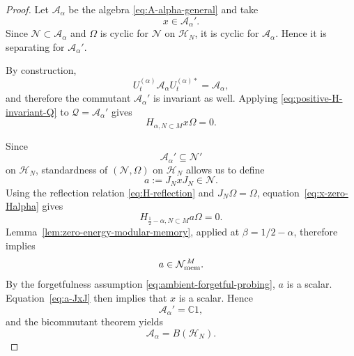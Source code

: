 \documentclass[a4paper,11pt]{article}
\theoremstyle{definition}
\begin{document}
\begin{proof}
Let $\mathcal A_\alpha$ be the algebra
\eqref{eq:A-alpha-general} and take
\begin{equation}
    x\in\mathcal A_\alpha'.
\end{equation}
Since $\mathcal N\subset\mathcal A_\alpha$ and $\Omega$ is cyclic for
$\mathcal N$ on $\mathcal H_N$, it is cyclic for $\mathcal A_\alpha$.
Hence it is separating for $\mathcal A_\alpha'$.

By construction,
\begin{equation}
    U_t^{(\alpha)}
    \mathcal A_\alpha
    U_t^{(\alpha)*}
    =
    \mathcal A_\alpha,
\end{equation}
and therefore the commutant $\mathcal A_\alpha'$ is invariant as well.
Applying \eqref{eq:positive-H-invariant-Q} to
$\mathcal Q=\mathcal A_\alpha'$ gives
\begin{equation}
    H_{\alpha,N\subset M}x\Omega=0.
    \label{eq:x-zero-Halpha}
\end{equation}

Since
\begin{equation}
    \mathcal A_\alpha'\subseteq\mathcal N'
\end{equation}
on $\mathcal H_N$, standardness of $(\mathcal N,\Omega)$ on
$\mathcal H_N$ allows us to define
\begin{equation}
    a:=J_NxJ_N\in\mathcal N.
    \label{eq:a-JxJ}
\end{equation}
Using the reflection relation \eqref{eq:H-reflection} and
$J_N\Omega=\Omega$, equation~\eqref{eq:x-zero-Halpha} gives
\begin{equation}
    H_{\frac12-\alpha,N\subset M}a\Omega=0.
    \label{eq:a-zero-Hbeta}
\end{equation}
Lemma~\ref{lem:zero-energy-modular-memory}, applied at
$\beta=1/2-\alpha$, therefore implies
\begin{equation}
    a\in
    \mathcal N_{\rm mem}^{\,M}.
\end{equation}
By the forgetfulness assumption \eqref{eq:ambient-forgetful-probing},
$a$ is a scalar. Equation~\eqref{eq:a-JxJ} then implies that $x$ is a
scalar. Hence
\begin{equation}
    \mathcal A_\alpha'=\mathbb C1,
\end{equation}
and the bicommutant theorem yields
\begin{equation}
    \mathcal A_\alpha=B(\mathcal H_N).
\end{equation}
\end{proof}
\end{document}
